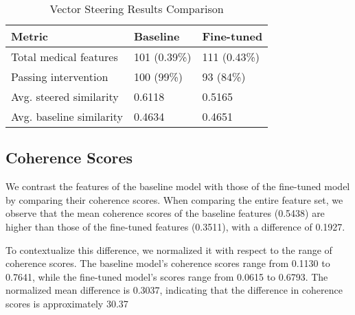 \begin{table}[h]
\centering
\footnotesize
\begin{tabularx}{\columnwidth}{@{}lXX@{}}
\toprule
\textbf{Metric} & \textbf{Baseline} & \textbf{Fine-tuned} \\
\midrule
Total medical features & 101 (0.39\%) & 111 (0.43\%) \\
Passing intervention & 100 (99\%) & 93 (84\%) \\
Avg. steered similarity & 0.6118 & 0.5165 \\
Avg. baseline similarity & 0.4634 & 0.4651 \\
\bottomrule
\end{tabularx}
\caption{Vector Steering Results Comparison}
\label{tab:intervention_results}
\end{table}

\subsection{Coherence Scores}

We contrast the features of the baseline model with those of the fine-tuned model by comparing their coherence scores. When comparing the entire feature set, we observe that the mean coherence scores of the baseline features (0.5438) are higher than those of the fine-tuned features (0.3511), with a difference of 0.1927.

To contextualize this difference, we normalized it with respect to the range of coherence scores. The baseline model's coherence scores range from 0.1130 to 0.7641, while the fine-tuned model's scores range from 0.0615 to 0.6793. The normalized mean difference is 0.3037, indicating that the difference in coherence scores is approximately 30.37%


